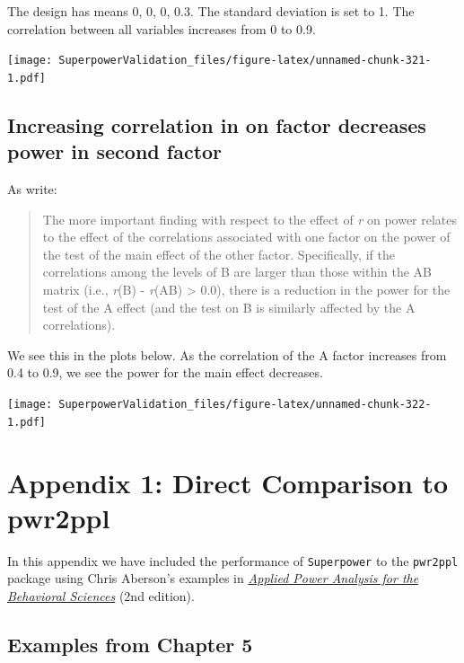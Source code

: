 \documentclass[]{book}
\begin{document}
The design has means 0, 0, 0, 0.3. The standard deviation is set to 1. The correlation between all variables increases from 0 to 0.9.

\texttt{[image: SuperpowerValidation\_files/figure-latex/unnamed-chunk-321-1.pdf]}
\pagebreak

\hypertarget{increasing-correlation-in-on-factor-decreases-power-in-second-factor}{%
\section{Increasing correlation in on factor decreases power in second factor}\label{increasing-correlation-in-on-factor-decreases-power-in-second-factor}}

As \citet{potvin2000statistical} write:

\begin{quote}
The more important finding with respect to the effect of \emph{r} on power relates to the effect of the correlations associated with one factor on the power of the test of the main effect of the other factor. Specifically, if the correlations among the levels of B are larger than those within the AB matrix (i.e., \emph{r}(B) - \emph{r}(AB) \textgreater{} 0.0), there is a reduction in the power for the test of the A effect (and the test on B is similarly affected by the A correlations).
\end{quote}

We see this in the plots below. As the correlation of the A factor increases from 0.4 to 0.9, we see the power for the main effect decreases.

\texttt{[image: SuperpowerValidation\_files/figure-latex/unnamed-chunk-322-1.pdf]}

\hypertarget{appendix-1-direct-comparison-to-pwr2ppl}{%
\chapter*{Appendix 1: Direct Comparison to pwr2ppl}\label{appendix-1-direct-comparison-to-pwr2ppl}}

In this appendix we have included the performance of \texttt{Superpower} to the \texttt{pwr2ppl} package using Chris Aberson's examples in \href{https://www.crcpress.com/Applied-Power-Analysis-for-the-Behavioral-Sciences-2nd-Edition/Aberson/p/book/9781138044593}{\emph{Applied Power Analysis for the Behavioral Sciences}} (2nd edition).

\hypertarget{examples-from-chapter-5}{%
\section{Examples from Chapter 5}\label{examples-from-chapter-5}}
\end{document}

